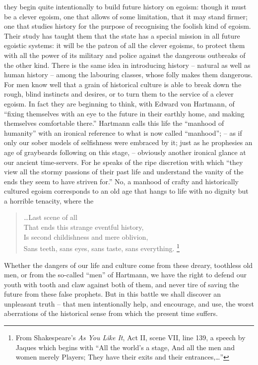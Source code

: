 they begin quite intentionally to build future history on egoism:
though it must be a clever egoism, one that allows of some
limitation, that it may stand firmer; one that studies history for
the purpose of recognising the foolish kind of egoism. Their study
has taught them that the state has a special mission in all future
egoistic systems: it will be the patron of all the clever egoisms, to
protect them with all the power of its military and police against
the dangerous outbreaks of the other kind. There is the same idea in
introducing history -- natural as well as human history -- among the
labouring classes, whose folly makes them dangerous. For men know
well that a grain of historical culture is able to break down the
rough, blind instincts and desires, or to turn them to the service of
a clever egoism. In fact they are beginning to think, with Edward von
Hartmann, of \enquote{fixing themselves with an eye to the future in their
earthly home, and making themselves comfortable there.} Hartmann
calls this life the \enquote{manhood of humanity} with an ironical reference
to what is now called \enquote{manhood}; -- as if only our sober models of
selfishness were embraced by it; just as he prophesies an age of
graybeards following on this stage, -- obviously another ironical
glance at our ancient time-servers. For he speaks of the ripe
discretion with which \enquote{they view all the stormy passions of their
past life and understand the vanity of the ends they seem to have
striven for.} No, a manhood of crafty and historically cultured
egoism corresponds to an old age that hangs to life with no dignity
but a horrible tenacity, where the
\begin{quote}
                           \hfill \ldots Last scene of all\\
  That ends this strange eventful history,\\
  Is second childishness and mere oblivion,\\
  Sans teeth, sans eyes, sans taste, sans everything.
\footnote{From Shakespeare's \textit{As You Like It}, Act II, scene VII, line 139, a speech by Jaques which begins with \enquote{All the world's a stage,
And all the men and women merely Players;
They have their exits and their entrances,\ldots}}
\end{quote}
Whether the dangers of our life and culture come from these dreary,
toothless old men, or from the so-called \enquote{men} of Hartmann, we have
the right to defend our youth with tooth and claw against both of
them, and never tire of saving the future from these false prophets.
But in this battle we shall discover an unpleasant truth -- that men
intentionally help, and encourage, and use, the worst aberrations of
the historical sense from which the present time suffers.

